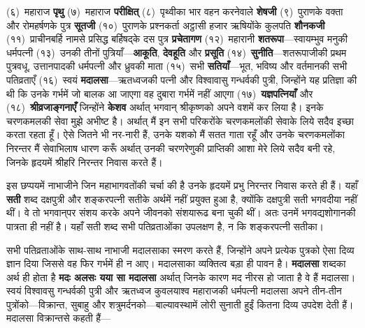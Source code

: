 \begin{sloppypar}\justifying{}
(६)~महाराज \textbf{पृथु} (७)~महाराज \textbf{परीक्षित्} (८)~पृथ्वीका भार वहन करनेवाले \textbf{शेषजी} (९)~पुराणके वक्ता और रोमहर्षणके पुत्र \textbf{सूतजी} (१०)~पुराणके प्रश्नकर्ता अट्ठासी हजार ऋषियोंके कुलपति \textbf{शौनकजी} (११)~प्राचीनबर्हि नामसे प्रसिद्ध बर्हिषद्‍के दस पुत्र \textbf{प्रचेतागण} (१२)~महारानी\textbf{ शतरूपा}—स्वायम्भुव मनुकी धर्मपत्नी (१३)~उनकी तीनों पुत्रियाँ—\textbf{आकूति}, \textbf{देवहूति} और \textbf{प्रसूति} (१४)~\textbf{सुनीति}—शतरूपाजीकी प्रथम पुत्रवधू, उत्तानपादकी धर्मपत्नी और ध्रुवकी माता (१५)~सभी \textbf{सतियाँ}—भूत, भविष्य और वर्तमानकी सभी पतिव्रताएँ (१६)~स्वयं \textbf{मदालसा}—ऋतध्वजकी पत्नी और विश्वावासु गन्धर्वकी पुत्री, जिन्होंने यह प्रतिज्ञा की थी कि उनके गर्भमें जो बालक आ जाएगा वह दुबारा गर्भमें नहीं आएगा (१७)~\textbf{यज्ञपत्नियाँ} और (१८)~\textbf{श्रीव्रजाङ्गनाएँ} जिन्होंने \textbf{केशव} अर्थात् भगवान् श्रीकृष्णको अपने वशमें कर लिया है। इनके चरण\-कमलकी सेवा मुझे अभीष्ट है। अर्थात् मैं इन सभी परिकरोंके चरणकमलोंकी सेवाके लिये सदैव इच्छा करता रहता हूँ। ऐसे जितने भी नर-नारी हैं, उनके यशको मैं सतत गाता रहूँ और उनके चरण\-कमलोंका निरन्तर मैं सेवाभिलाष धारण करूँ अर्थात् उनकी चरण\-रेणुकी प्राप्तिकी आशा मेरे लिये सदैव बनी रहे, जिनके हृदयमें श्रीहरि निरन्तर निवास करते हैं।
\end{sloppypar}
\begin{sloppypar}\justifying{}
इस छप्पयमें नाभाजीने जिन महाभागवतोंकी चर्चा की है उनके हृदयमें प्रभु निरन्तर निवास करते ही हैं। यहाँ \textbf{सती} शब्द दक्षपुत्री और शङ्करपत्नी सतीके अर्थमें नहीं प्रयुक्त हुआ है, क्योंकि दक्षपुत्री सती भगवदीया नहीं थीं। वे तो भगवान्‌पर संशय करके अपने जीवनको संशयारूढ बना चुकी थीं। अतः उनमें भगवद्यशोगानकी पात्रता ही नहीं है। यहाँ सती शब्द सभी पतिव्रताओंका उपलक्षण है, न कि शङ्करपत्नी सतीका।
\end{sloppypar}
\begin{sloppypar}\justifying{}
सभी पतिव्रताओंके साथ-साथ नाभाजी मदालसाका स्मरण करते हैं, जिन्होंने अपने प्रत्येक पुत्रको ऐसा दिव्य ज्ञान दिया जिससे वह फिर गर्भमें ही न आए। मदालसाका व्यक्तित्व बड़ा ही पावन है। \textbf{मदालसा} शब्दका अर्थ ही होता है \textbf{मदः अलसः यया सा मदालसा} अर्थात् जिनके कारण मद नीरस हो जाता है वे हैं मदालसा। स्वयं विश्वावसु गन्धर्वकी पुत्री और ऋतध्वज कुवलयाश्व महाराजकी धर्मपत्नी मदालसा अपने तीन-तीन पुत्रोंको—विक्रान्त, सुबाहु और शत्रुमर्दनको—बाल्यावस्थामें लोरी सुनाती हुईं कितना दिव्य उपदेश देती हैं। मदालसा विक्रान्तसे कहती हैं—
\end{sloppypar}

